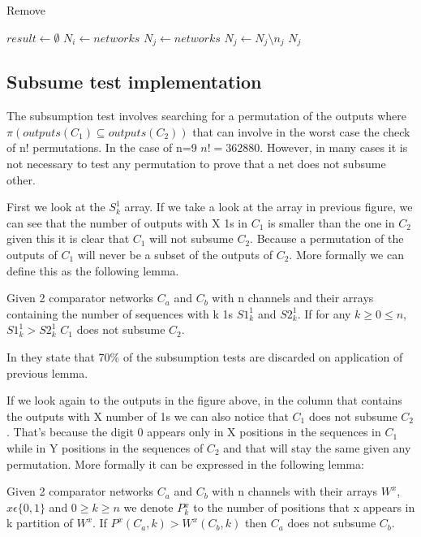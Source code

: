 \documentclass[../main.tex]{subfiles}
\begin{document}
	\begin{algorithm}[H]
		\caption{Remove} 
		\begin{algorithmic}
			\STATE $result \leftarrow \emptyset$
			\STATE $N_i \leftarrow networks$
			\STATE $N_j \leftarrow networks$
			\STATE $N_j \leftarrow N_j \setminus n_j$
			\ENDIF
			\ENDFOR
			\ENDFOR
			\RETURN $N_j$
		\end{algorithmic}
	\end{algorithm}
		
	\subsection{Subsume test implementation}
	The subsumption test involves searching for a permutation of the outputs where $\pi(outputs(C_1) \subseteq outputs(C_2))$ that can involve in the worst case the check of n! permutations. In the case of n=9 $n! = 362880$. However, in many cases it is not necessary to test any permutation to prove that a net does not subsume other. 
	
	First we look at the $S^{1}_k$ array. If we take a look at the array in previous figure, we can see that the number of outputs with X 1s in $C_1$ is smaller than the one in $C_2$ given this it is clear that $C_1$ will not subsume $C_2$. Because a permutation of the outputs of $C_1$ will never be a subset of the outputs of $C_2$. More formally we can define this as the following lemma.
	
	\begin{lemma}
		Given 2 comparator networks $C_a$ and $C_b$ with n channels and their arrays containing the number of sequences with k 1s $S1^{1}_k$ and $S2^{1}_k$. If for any $k\geq 0 \leq n$, $S1^{1}_k > S2^{1}_k$ $C_1$ does not subsume $C_2$.
	\end{lemma}
	
	In \cite{sortingnineinputs} they state that 70\% of the subsumption tests are discarded on application of previous lemma.
	
	If we look again to the outputs in the figure above, in the column that contains the outputs with X number of 1s we can also notice that $C_1$ does not subsume $C_2$. That's because the digit 0 appears only in X positions in the sequences in $C_1$ while in Y positions in the sequences of $C_2$ and that will stay the same given any permutation. More formally it can be expressed in the following lemma:
	
	\begin{lemma}
	Given 2 comparator networks $C_a$ and $C_b$ with n channels with their arrays $W^x$, $x \epsilon \{0,1\}$ and $0\geq k \geq n$ we denote $P{^x_k}$ to the number of positions that x appears in k partition of $W^x$. If $P^x(C_a, k) > W^x(C_b, k)$ then $C_a$ does not subsume $C_b$.
	\end{lemma}
\end{document}

